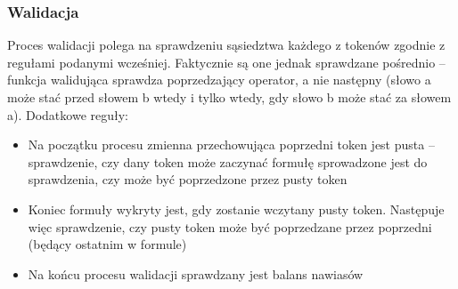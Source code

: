 \documentclass[12pt,a4paper,titlepage]{article}
\begin{document}
\subsubsection{Walidacja}
Proces walidacji polega na sprawdzeniu sąsiedztwa każdego z tokenów zgodnie z regułami podanymi wcześniej. Faktycznie są one jednak sprawdzane pośrednio – funkcja walidująca sprawdza poprzedzający operator, a nie następny (słowo a może stać przed słowem b wtedy i tylko wtedy, gdy słowo b może stać za słowem a). Dodatkowe reguły:
\begin{itemize}
	\item Na początku procesu zmienna przechowująca poprzedni token jest pusta – sprawdzenie, czy dany token może zaczynać formułę sprowadzone jest do sprawdzenia, czy może być poprzedzone przez pusty token
	\item Koniec formuły wykryty jest, gdy zostanie wczytany pusty token. Następuje więc sprawdzenie, czy pusty token może być poprzedzane przez poprzedni (będący ostatnim w formule)
	\item Na końcu procesu walidacji sprawdzany jest balans nawiasów
\end{itemize}
\end{document}
